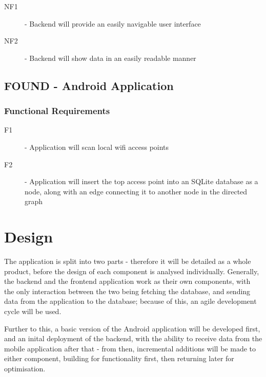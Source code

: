 \documentclass[11pt]{informatics-report}
\begin{document}
\begin{description}
\item[NF1] - Backend will provide an easily navigable user interface
\item[NF2] - Backend will show data in an easily readable manner
\end{description}

\section{FOUND - Android Application}

\subsection{Functional Requirements}

\begin{description}
\item[F1] - Application will scan local wifi access points
\item[F2] - Application will insert the top access point into an SQLite database as a node, along with an edge connecting it to another node in the directed graph
\end{description}

\chapter{Design}
The application is split into two parts - therefore it will be detailed as a whole product, before the design of each component is analysed individually. Generally, the backend and the frontend application work as their own components, with the only interaction between the two being fetching the database, and sending data from the application to the database; because of this, an agile development cycle will be used. 

Further to this, a basic version of the Android application will be developed first, and an inital deployment of the backend, with the ability to receive data from the mobile application after that - from then, incremental additions will be made to either component, building for functionality first, then returning later for optimisation. 
\newpage
\end{document}
